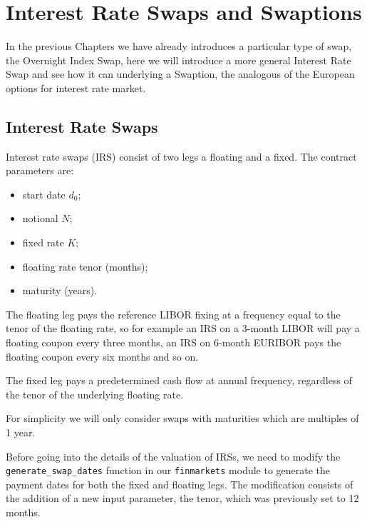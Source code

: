 \chapter{Interest Rate Swaps and Swaptions}\label{interest-rate-swaps-and-swaptions}

In the previous Chapters we have already introduces a particular type of swap, the Overnight Index Swap, here we will introduce a more general Interest Rate Swap and see how it can underlying a Swaption, the analogous of the European options for interest rate market.

\section{Interest Rate Swaps}\label{interest-rate-swaps}

Interest rate swaps (IRS) consist of two legs a floating and a fixed. The
contract parameters are:

\begin{itemize}
\tightlist
\item
  start date \(d_0\);
\item
  notional \(N\);
\item
  fixed rate \(K\);
\item
  floating rate tenor (months);
\item
  maturity (years).
\end{itemize}

The floating leg pays the reference LIBOR fixing at a frequency equal to
the tenor of the floating rate, so for example an IRS on a 3-month
LIBOR will pay a floating coupon every three months, an IRS on 6-month
EURIBOR pays the floating coupon every six months and so on.

The fixed leg pays a predetermined cash flow at annual frequency,
regardless of the tenor of the underlying floating rate. 

For simplicity we will only consider swaps with maturities which are multiples of 1
year.

Before going into the details of the valuation of IRSs, we need to
modify the \texttt{generate\_swap\_dates} function in our
\texttt{finmarkets} module to generate the payment dates for both the
fixed and floating legs. The modification consists of the addition of a new input
parameter, the tenor, which was previously set to 12 months.

